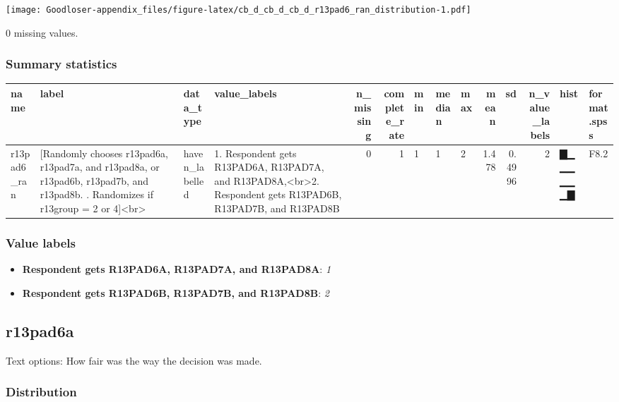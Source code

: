 \documentclass[
]{book}
\providecommand{\tightlist}{%
  \setlength{\itemsep}{0pt}\setlength{\parskip}{0pt}}
\begin{document}
\texttt{[image: Goodloser-appendix\_files/figure-latex/cb\_d\_cb\_d\_cb\_d\_r13pad6\_ran\_distribution-1.pdf]}

0 missing values.

\hypertarget{r13pad6_ran_summary}{%
\subsubsection{Summary statistics}\label{r13pad6_ran_summary}}

\begin{tabular}{l|l|l|l|r|r|l|l|l|r|r|r|l|l}
\hline
name & label & data_type & value_labels & n_missing & complete_rate & min & median & max & mean & sd & n_value_labels & hist & format.spss\\
\hline
r13pad6_ran & [Randomly chooses r13pad6a, r13pad7a, and r13pad8a, or r13pad6b, r13pad7b, and r13pad8b. . Randomizes if r13group = 2 or 4]<br> & haven_labelled & 1. Respondent gets R13PAD6A, R13PAD7A, and R13PAD8A,<br>2. Respondent gets R13PAD6B, R13PAD7B, and R13PAD8B & 0 & 1 & 1 & 1 & 2 & 1.478 & 0.4996 & 2 & ▇▁▁▁▁▁▁▇ & F8.2\\
\hline
\end{tabular}

\hypertarget{r13pad6_ran_labels}{%
\subsubsection{Value labels}\label{r13pad6_ran_labels}}

\begin{itemize}
\tightlist
\item
  \textbf{Respondent gets R13PAD6A, R13PAD7A, and R13PAD8A}: \emph{1}
\item
  \textbf{Respondent gets R13PAD6B, R13PAD7B, and R13PAD8B}: \emph{2}
\end{itemize}

\hypertarget{r13pad6a}{%
\subsection{r13pad6a}\label{r13pad6a}}

Text options: How fair was the way the decision was made.

\hypertarget{r13pad6a_distribution}{%
\subsubsection{Distribution}\label{r13pad6a_distribution}}
\end{document}
